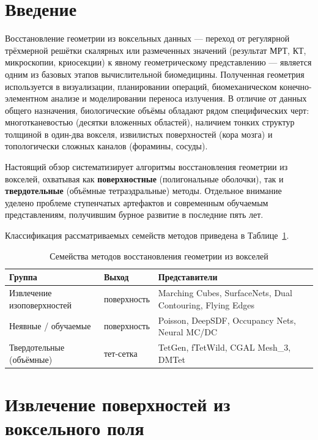 \documentclass[a4paper,14pt]{article}
\begin{document}

\newpage

\section{Введение}

Восстановление геометрии из воксельных данных --- переход от регулярной трёхмерной решётки скалярных или размеченных значений (результат МРТ, КТ, микроскопии, криосекции) к явному геометрическому представлению --- является одним из базовых этапов вычислительной биомедицины. Полученная геометрия используется в визуализации, планировании операций, биомеханическом конечно-элементном анализе и моделировании переноса излучения. В отличие от данных общего назначения, биологические объёмы обладают рядом специфических черт: многотканевостью (десятки вложенных областей), наличием тонких структур толщиной в один-два вокселя, извилистых поверхностей (кора мозга) и топологически сложных каналов (форамины, сосуды).

Настоящий обзор систематизирует алгоритмы восстановления геометрии из вокселей, охватывая как \textbf{поверхностные} (полигональные оболочки), так и \textbf{твердотельные} (объёмные тетраэдральные) методы. Отдельное внимание уделено проблеме ступенчатых артефактов и современным обучаемым представлениям, получившим бурное развитие в последние пять лет.

Классификация рассматриваемых семейств методов приведена в Таблице~\ref{tab:tax}.

\begin{table}[H]
\centering
\caption{Семейства методов восстановления геометрии из вокселей}
\label{tab:tax}
\begin{tabular}{|l|l|l|}
\hline
\textbf{Группа} & \textbf{Выход} & \textbf{Представители} \\ \hline
Извлечение изоповерхностей & поверхность & Marching Cubes, SurfaceNets, Dual Contouring, Flying Edges \\ \hline
Неявные / обучаемые       & поверхность & Poisson, DeepSDF, Occupancy Nets, Neural MC/DC \\ \hline
Твердотельные (объёмные)  & тет-сетка   & TetGen, fTetWild, CGAL Mesh\_3, DMTet \\ \hline
\end{tabular}
\end{table}

\section{Извлечение поверхностей из воксельного поля}
\end{document}
